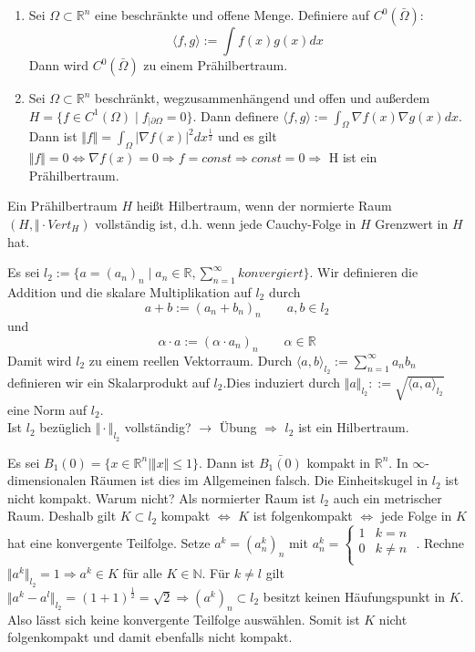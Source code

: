 \documentclass[12pt,titlepage]{article}
\begin{document}
\begin{bsp}
\begin{enumerate}
\item Sei $\Omega\subset \mathbb{R}^n$ eine beschränkte und offene Menge. Definiere auf $C^0(\bar{\Omega})$:
\[
\langle f,g \rangle := \int f(x)g(x)dx
\]
Dann wird $C^0(\bar{\Omega})$ zu einem Prähilbertraum.
\item Sei $\Omega \subset \mathbb{R}^n$ beschränkt, wegzusammenhängend und offen und außerdem $H=\{f \in C^1(\Omega)\mid f_{|\partial \Omega}=0\}$. Dann definere $\langle f,g \rangle:=\int_\Omega \nabla f(x) \nabla g(x)dx$. Dann ist $\Vert f\Vert =\int_\Omega \vert \nabla f(x)\vert^2dx^{\frac{1}{2}}$ und es gilt $\Vert f \Vert =0 \Leftrightarrow \nabla f(x)=0 \Rightarrow f=const \Rightarrow const =0\Rightarrow$ H ist ein Prähilbertraum.
\end{enumerate}
\end{bsp}
\begin{definition}
Ein Prähilbertraum $H$ heißt Hilbertraum, wenn der normierte Raum $(H,\Vert \cdot Vert_H)$ vollständig ist, d.h. wenn jede Cauchy-Folge in $H$ Grenzwert in $H$ hat.
\end{definition}
\begin{bsp}
Es sei $l_2:=\{a=(a_n)_n \mid a_n \in \mathbb{R}, \sum_{n=1}^{\infty} konvergiert \}$. Wir definieren die Addition und die skalare Multiplikation auf $l_2$ durch 
\[
a+b:=(a_n+b_n)_n \qquad a,b \in l_2
\]
und 
\[
\alpha \cdot a:= (\alpha\cdot a_n)_n \qquad \alpha \in \mathbb{R}
\]
Damit wird $l_2$ zu einem reellen Vektorraum. Durch $\langle  a,b\rangle_{l_2}:= \sum_{n=1}^{\infty}a_nb_n$ definieren wir ein Skalarprodukt auf $l_2$.Dies induziert durch $\Vert a \Vert_{l_2}::=\sqrt{\langle  a,a\rangle_{l_2}}$ eine Norm auf $l_2$.\\
Ist $l_2$ bezüglich $\Vert \cdot \Vert_{l_2}$ vollständig? $\rightarrow$ Übung $\Rightarrow$ $l_2$ ist ein Hilbertraum.
\end{bsp}
\begin{bemerkung}
Es sei $B_1(0)=\{x\in \mathbb{R}^n\mid \Vert x \Vert \leq 1\}$. Dann ist $\bar{B_1(0)}$ kompakt in $\mathbb{R}^n$. In $\infty$-dimensionalen Räumen ist dies im Allgemeinen falsch. Die Einheitskugel in $l_2$ ist nicht kompakt. Warum nicht? Als normierter Raum ist $l_2$ auch ein metrischer Raum. Deshalb gilt $K \subset l_2$ kompakt $\Leftrightarrow$ $K$ ist folgenkompakt $\Leftrightarrow $ jede Folge in $K$ hat eine konvergente Teilfolge.
Setze $a^k=(a^k_n)_n$ mit $a^k_n=
 \left\{
\begin{array}{ll}
1 & k =n \\
0 & k \neq n \\
\end{array}
\right.$ . Rechne $\Vert a^k \Vert_{l_2} =1 \Rightarrow a^k \in K$ für alle $K\in \mathbb{N}$. Für $k\neq l$ gilt $\Vert a^k-a^l \Vert_{l_2}=(1+1)^{\frac{1}{2}}=\sqrt{2} \Rightarrow (a^k)_n \subset l_2$ besitzt keinen Häufungspunkt in $K$. Also lässt sich keine konvergente Teilfolge auswählen. Somit ist $K$ nicht folgenkompakt und damit ebenfalls nicht kompakt.
\end{bemerkung}
\end{document}
